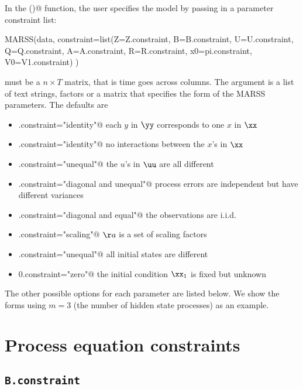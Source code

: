 In the \verb@MARSS()@ function, the user specifies the model by passing in a parameter constraint list:
\begin{Schunk}
\begin{Sinput}
MARSS(data, constraint=list(Z=Z.constraint, B=B.constraint, 
       U=U.constraint, Q=Q.constraint, A=A.constraint, 
       R=R.constraint, x0=pi.constraint, V0=V1.constraint) ) 
\end{Sinput}
\end{Schunk}
\verb@data@ must be a $n \times T$ matrix, that is time goes across columns.   The argument \verb@constraint@ is a list of text strings, factors or a matrix that specifies the form of the MARSS parameters.  The defaults are
\begin{itemize}
\item[] \verb@Z.constraint="identity"@ each $y$ in $\yy$ corresponds to one $x$ in $\xx$
\item[] \verb@B.constraint="identity"@ no interactions between the $x$'s in $\xx$
\item[] \verb@U.constraint="unequal"@ the $u$'s in $\uu$ are all different
\item[] \verb@Q.constraint="diagonal and unequal"@ process errors are independent but have different variances
\item[] \verb@R.constraint="diagonal and equal"@ the observations are i.i.d.
\item[] \verb@A.constraint="scaling"@ $\aa$ is a set of scaling factors
\item[] \verb@pi.constraint="unequal"@ all initial states are different
\item[] \verb@V0.constraint="zero"@ the initial condition $\xx_1$ is fixed but unknown
\end{itemize}
The other possible \verb@constraint@ options for each parameter are listed below.  We show the forms using $m=3$ (the number of hidden state processes) as an example.

\section{Process equation constraints}

\subsection{\texttt{B.constraint}}

